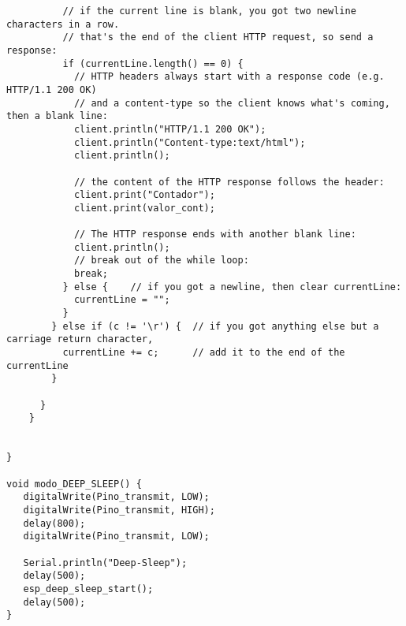 \begin{lstlisting}
          // if the current line is blank, you got two newline characters in a row.
          // that's the end of the client HTTP request, so send a response:
          if (currentLine.length() == 0) {
            // HTTP headers always start with a response code (e.g. HTTP/1.1 200 OK)
            // and a content-type so the client knows what's coming, then a blank line:
            client.println("HTTP/1.1 200 OK");
            client.println("Content-type:text/html");
            client.println();

            // the content of the HTTP response follows the header:
            client.print("Contador");
            client.print(valor_cont);

            // The HTTP response ends with another blank line:
            client.println();
            // break out of the while loop:
            break;
          } else {    // if you got a newline, then clear currentLine:
            currentLine = "";
          }
        } else if (c != '\r') {  // if you got anything else but a carriage return character,
          currentLine += c;      // add it to the end of the currentLine
        }

      }
    }


}

void modo_DEEP_SLEEP() {
   digitalWrite(Pino_transmit, LOW);
   digitalWrite(Pino_transmit, HIGH);
   delay(800);
   digitalWrite(Pino_transmit, LOW);
  
   Serial.println("Deep-Sleep");
   delay(500);
   esp_deep_sleep_start();
   delay(500);
}


\end{lstlisting}